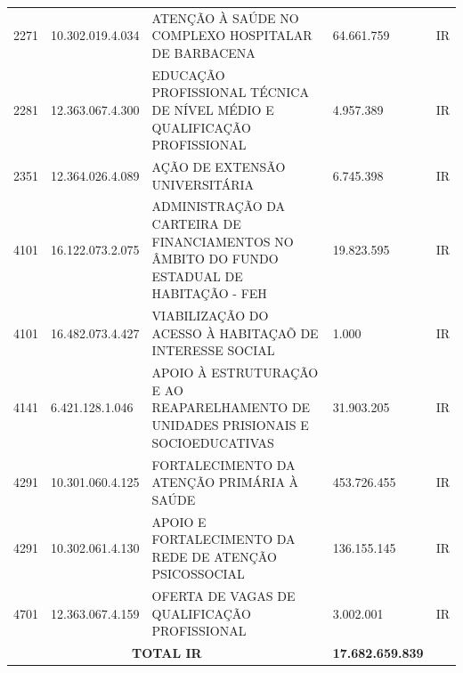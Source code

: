 \documentclass{article}
\begin{document}
\begin{longtable}[c]{m{1cm}|m{2cm}|m{10cm}|m{2cm}|m{1cm}}
\multicolumn{1}{C{1cm}|}{2271} & \multicolumn{1}{C{2cm}|}{10.302.019.4.034} & \multicolumn{1}{L{10cm}|}{ATENÇÃO À SAÚDE NO COMPLEXO HOSPITALAR DE BARBACENA} & \multicolumn{1}{R{2cm}|}{64.661.759} & \multicolumn{1}{C{1cm}}{IR} \\
\multicolumn{1}{C{1cm}|}{2281} & \multicolumn{1}{C{2cm}|}{12.363.067.4.300} & \multicolumn{1}{L{10cm}|}{EDUCAÇÃO PROFISSIONAL TÉCNICA DE NÍVEL MÉDIO E QUALIFICAÇÃO PROFISSIONAL} & \multicolumn{1}{R{2cm}|}{4.957.389} & \multicolumn{1}{C{1cm}}{IR} \\
\multicolumn{1}{C{1cm}|}{2351} & \multicolumn{1}{C{2cm}|}{12.364.026.4.089} & \multicolumn{1}{L{10cm}|}{AÇÃO DE EXTENSÃO UNIVERSITÁRIA} & \multicolumn{1}{R{2cm}|}{6.745.398} & \multicolumn{1}{C{1cm}}{IR} \\
\multicolumn{1}{C{1cm}|}{4101} & \multicolumn{1}{C{2cm}|}{16.122.073.2.075} & \multicolumn{1}{L{10cm}|}{ADMINISTRAÇÃO DA CARTEIRA DE FINANCIAMENTOS NO ÂMBITO DO FUNDO ESTADUAL DE HABITAÇÃO - FEH} & \multicolumn{1}{R{2cm}|}{19.823.595} & \multicolumn{1}{C{1cm}}{IR} \\
\multicolumn{1}{C{1cm}|}{4101} & \multicolumn{1}{C{2cm}|}{16.482.073.4.427} & \multicolumn{1}{L{10cm}|}{VIABILIZAÇÃO DO ACESSO À HABITAÇAÕ DE INTERESSE SOCIAL} & \multicolumn{1}{R{2cm}|}{1.000} & \multicolumn{1}{C{1cm}}{IR} \\
\multicolumn{1}{C{1cm}|}{4141} & \multicolumn{1}{C{2cm}|}{6.421.128.1.046} & \multicolumn{1}{L{10cm}|}{APOIO À ESTRUTURAÇÃO E AO REAPARELHAMENTO DE UNIDADES PRISIONAIS E SOCIOEDUCATIVAS} & \multicolumn{1}{R{2cm}|}{31.903.205} & \multicolumn{1}{C{1cm}}{IR} \\
\multicolumn{1}{C{1cm}|}{4291} & \multicolumn{1}{C{2cm}|}{10.301.060.4.125} & \multicolumn{1}{L{10cm}|}{FORTALECIMENTO DA ATENÇÃO PRIMÁRIA À SAÚDE} & \multicolumn{1}{R{2cm}|}{453.726.455} & \multicolumn{1}{C{1cm}}{IR} \\
\multicolumn{1}{C{1cm}|}{4291} & \multicolumn{1}{C{2cm}|}{10.302.061.4.130} & \multicolumn{1}{L{10cm}|}{APOIO E FORTALECIMENTO DA REDE DE ATENÇÃO PSICOSSOCIAL} & \multicolumn{1}{R{2cm}|}{136.155.145} & \multicolumn{1}{C{1cm}}{IR} \\
\multicolumn{1}{C{1cm}|}{4701} & \multicolumn{1}{C{2cm}|}{12.363.067.4.159} & \multicolumn{1}{L{10cm}|}{OFERTA DE VAGAS DE QUALIFICAÇÃO PROFISSIONAL} & \multicolumn{1}{R{2cm}|}{3.002.001} & \multicolumn{1}{C{1cm}}{IR} \\
\hline\hline
\multicolumn{3}{c|}{ \textbf{TOTAL IR}} & \multicolumn{1}{R{2cm}|}{ \textbf{17.682.659.839}} &  \\

\end{longtable}
\end{document}
